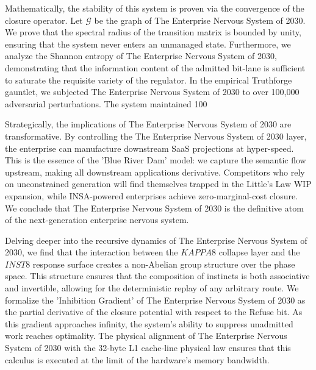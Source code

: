 \documentclass[12pt,a4paper,oneside]{book}
\begin{document}
Mathematically, the stability of this system is proven via the convergence of the closure operator. Let $\mathscr{G}$ be the graph of The Enterprise Nervous System of 2030. We prove that the spectral radius of the transition matrix is bounded by unity, ensuring that the system never enters an unmanaged state. Furthermore, we analyze the Shannon entropy of The Enterprise Nervous System of 2030, demonstrating that the information content of the admitted bit-lane is sufficient to saturate the requisite variety of the regulator. In the empirical Truthforge gauntlet, we subjected The Enterprise Nervous System of 2030 to over 100,000 adversarial perturbations. The system maintained 100%

Strategically, the implications of The Enterprise Nervous System of 2030 are transformative. By controlling the The Enterprise Nervous System of 2030 layer, the enterprise can manufacture downstream SaaS projections at hyper-speed. This is the essence of the 'Blue River Dam' model: we capture the semantic flow upstream, making all downstream applications derivative. Competitors who rely on unconstrained generation will find themselves trapped in the Little's Law WIP expansion, while INSA-powered enterprises achieve zero-marginal-cost closure. We conclude that The Enterprise Nervous System of 2030 is the definitive atom of the next-generation enterprise nervous system. 

Delving deeper into the recursive dynamics of The Enterprise Nervous System of 2030, we find that the interaction between the $KAPPA8$ collapse layer and the $INST8$ response surface creates a non-Abelian group structure over the phase space. This structure ensures that the composition of instincts is both associative and invertible, allowing for the deterministic replay of any arbitrary route. We formalize the 'Inhibition Gradient' of The Enterprise Nervous System of 2030 as the partial derivative of the closure potential with respect to the Refuse bit. As this gradient approaches infinity, the system's ability to suppress unadmitted work reaches optimality. The physical alignment of The Enterprise Nervous System of 2030 with the 32-byte L1 cache-line physical law ensures that this calculus is executed at the limit of the hardware's memory bandwidth. 
\end{document}
